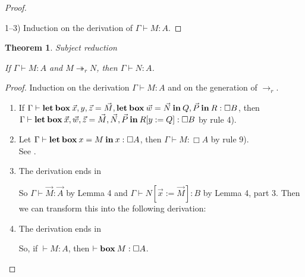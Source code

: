 \documentclass[a4paper]{article}
\newtheorem{theorem}{Theorem}
\begin{document}
\begin{proof}
  $ $

1--3) Induction on the derivation of $\Gamma \vdash M : A$.

\end{proof}

\begin{theorem} Subject reduction

  If $\Gamma \vdash M : A$ and $M \twoheadrightarrow_r N$, then $\Gamma \vdash N : A$.

\end{theorem}

\begin{proof}

Induction on the derivation $\Gamma \vdash M : A$ and on the generation of $\rightarrow_r$.

\begin{enumerate}

\item If $\Gamma \vdash {\bf let \: box \:} \vec{x}, y, \vec{z} = \vec{M}, {\bf let \: box \: } \vec{w} = \vec{N} {\bf \: in \: } Q, \vec{P}  {\: \bf in \:} R : \Box B$,
  then $\Gamma \vdash {\bf let \: box \:} \vec{x}, \vec{w}, \vec{z} = \vec{M}, \vec{N}, \vec{P} \: { \bf in } \: R [y := Q] : \Box B$ by rule 4).
\item Let $\Gamma \vdash {\bf let \: box \:} x = M {\: \bf in \: } x : \Box A$,
then $\Gamma \vdash M : \Box A$ by rule 9). \\ See \cite{ModalK}.
\item The derivation ends in
\begin{prooftree}
\end{prooftree}
So $\Gamma \vdash \vec{M} : \vec{A}$ by Lemma 4 and $\Gamma \vdash N [\vec{x} := \vec{M}] : B$ by Lemma 4, part 3.
Then we can transform this into the following derivation:
\begin{prooftree}
\end{prooftree}
\item The derivation ends in
\begin{prooftree}
\end{prooftree}
So, if $\vdash M : A$, then $\vdash {\bf box \:} M : \Box A$.
\end{enumerate}
\end{proof}
\end{document}
